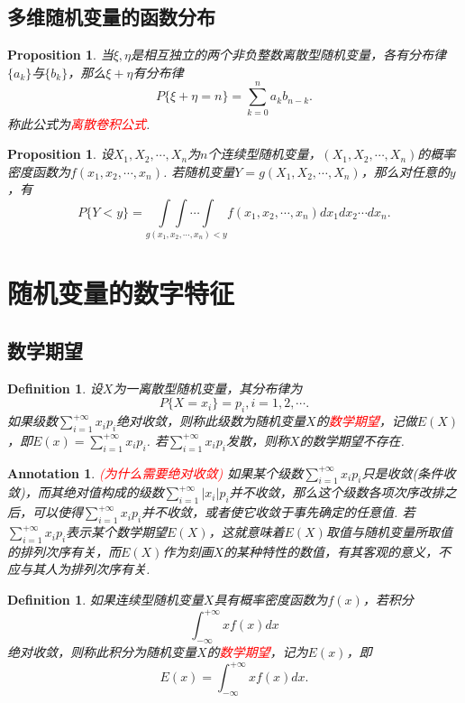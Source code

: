 \documentclass{article}
\newtheorem{proposition}[theorem]{Proposition}
\newtheorem{definition}[theorem]{Definition}
\newtheorem{annotation}[theorem]{Annotation}
\newcommand{\redt}[1]{\textcolor{red}{#1}}
\begin{document}
\subsection{多维随机变量的函数分布}

\begin{proposition}
\rm 当$\xi,\eta$是相互独立的两个非负整数离散型随机变量，各有分布律$\{a_k\}$与$\{b_k\}$，那么$\xi+\eta$有分布律
$$
P\{\xi+\eta = n\} = \sum\limits_{k=0}^n a_kb_{n-k}. 
$$
称此公式为\redt{离散卷积公式}.
\end{proposition}

\begin{proposition}
\rm 设$X_1,X_2,\cdots,X_n$为$n$个连续型随机变量，$(X_1,X_2,\cdots,X_n)$的概率密度函数为$f(x_1,x_2,\cdots,x_n)$. 若随机变量$Y=g(X_1,X_2,\cdots,X_n)$，那么对任意的$y$，有
$$
P\{Y < y\} = \underset{g(x_1,x_2,\cdots,x_n) < y}{\int\int\cdots\int}f(x_1,x_2,\cdots,x_n)dx_1dx_2\cdots dx_n.
$$
\end{proposition}


\section{随机变量的数字特征}

\subsection{数学期望}

\begin{definition}
\rm 设$X$为一离散型随机变量，其分布律为
$$
P\{X=x_i\} = p_i, i= 1,2,\cdots.
$$
如果级数$\sum\limits_{i=1}^{+\infty}x_ip_i$绝对收敛，则称此级数为随机变量$X$的\redt{数学期望}，记做$E(X)$，即$E(x) = \sum\limits_{i=1}^{+\infty}x_ip_i$. 若$\sum\limits_{i=1}^{+\infty}x_ip_i$发散，则称$X$的数学期望不存在. 
\end{definition}

\begin{annotation}
\rm \redt{(为什么需要绝对收敛)} 如果某个级数$\sum\limits_{i=1}^{+\infty}x_ip_i$只是收敛(条件收敛)，而其绝对值构成的级数$\sum\limits_{i=1}^{+\infty}|x_i|p_i$并不收敛，那么这个级数各项次序改排之后，可以使得$\sum\limits_{i=1}^{+\infty}x_ip_i$并不收敛，或者使它收敛于事先确定的任意值. 若$\sum\limits_{i=1}^{+\infty}x_ip_i$表示某个数学期望$E(X)$，这就意味着$E(X)$取值与随机变量所取值的排列次序有关，而$E(X)$作为刻画$X$的某种特性的数值，有其客观的意义，不应与其人为排列次序有关.
\end{annotation}

\begin{definition}
\rm 如果连续型随机变量$X$具有概率密度函数为$f(x)$，若积分
$$
\int_{-\infty}^{+\infty} xf(x)dx
$$
绝对收敛，则称此积分为随机变量$X$的\redt{数学期望}，记为$E(x)$，即
$$
E(x) = \int_{-\infty}^{+\infty} xf(x)dx. 
$$
\end{definition}
\end{document}
